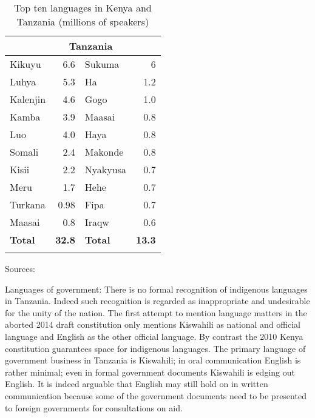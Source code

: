 \documentclass[output=paper,colorlinks,citecolor=brown]{langscibook}
\begin{document}
\begin{table}
    \begin{tabular}{lrlr}
    \lsptoprule
    \multicolumn{2}{c}{Kenya} & \multicolumn{2}{c}{Tanzania}\\
        \midrule
         Kikuyu & 6.6 &  Sukuma & 6 \\
          Luhya & 5.3 & Ha & 1.2 \\
          Kalenjin & 4.6  & Gogo & 1.0 \\
          Kamba & 3.9 & Maasai & 0.8 \\
          Luo & 4.0 & Haya & 0.8 \\
          Somali & 2.4 & Makonde & 0.8 \\
          Kisii & 2.2 & Nyakyusa & 0.7 \\
          Meru & 1.7 & Hehe & 0.7 \\
          Turkana & 0.98 & Fipa & 0.7 \\
          Maasai & 0.8 & Iraqw & 0.6 \\
        \midrule
    \textbf{Total} & \textbf{32.8} & \textbf{Total} & \textbf{13.3} \\
    \lspbottomrule
    \end{tabular}
    \caption{Top ten languages in Kenya and Tanzania (millions of speakers)}
    Sources: \cite{Kenya-National-Bureau-of-Statistics2009, Mradi-wa-Lugha-za-Tanzania2009}
    \label{tab:kioko:1}
\end{table}


Languages of government: There is no formal recognition of indigenous languages in Tanzania. Indeed such recognition is regarded as inappropriate and undesirable for the unity of the nation. The first attempt to mention language matters in the aborted 2014 draft constitution only mentions Kiswahili as national and official language and English as the other official language. By contrast the 2010 Kenya constitution guarantees space for indigenous languages. The primary language of government business in Tanzania is Kiswahili; in oral communication English is rather minimal; even in formal government documents Kiswahili is edging out English. It is indeed arguable that English may still hold on in written communication because some of the government documents need to be presented to foreign governments for consultations on aid.  
\end{document}
